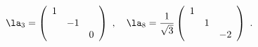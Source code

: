 \begin{equation}
\la_3 = \left(
\begin{array}{ccc}
 1& & \\
 & -1 & \\
 & & 0
\end{array}
\right)~,~~~
\la_8 = \frac{1}{\sqrt{3}}\left(
\begin{array}{ccc}
 1& & \\
 & 1 & \\
 & & -2
\end{array}
\right)~.
\label{Gell-Mann}
\end{equation}

